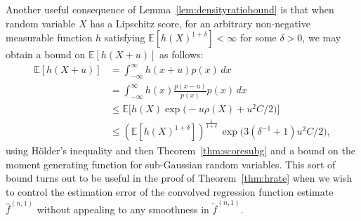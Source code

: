 \documentclass[aos]{imsart}
\newcommand{\E}{\mathbb{E}}
\begin{document}
	Another useful consequence of Lemma~\ref{lem:densityratiobound} is that when random variable $X$ has a Lipschitz score, for an arbitrary non-negative measurable function $h$ satisfying $\E [h(X)^{1+\delta}] < \infty$ for some $\delta > 0 $, we may obtain a bound on $\E [h(X + u)]$ as follows:
	\begin{align*}
		\E [h(X + u)]  &= \int_{-\infty}^\infty h(x+u) p(x) \, dx  \\
		&= \int_{-\infty}^\infty h(x) \frac{p(x-u)}{p(x)} p(x) \, dx \\
		&\leq \E \big[ h(X) \exp\big(-u \rho(X) + u^2 C / 2 \big) \big] \\
		&\leq \left(\E [h(X)^{1+\delta}]\right)^{\frac{1}{1+\delta}} \, \exp\big( 3(\delta^{-1} + 1 ) u^2C / 2 \big), 
	\end{align*}
	using H\"older's inequality and then Theorem~\ref{thm:scoresubg} and a bound on the moment generating function for sub-Gaussian random variables. This sort of bound turns out to be useful in the proof of Theorem~\ref{thm:hrate} when we wish to control the estimation error of the convolved regression function estimate $\hat{f}^{(n,1)}$ without appealing to any smoothness in $\tilde{f}^{(n,1)}$.
	
\end{document}
